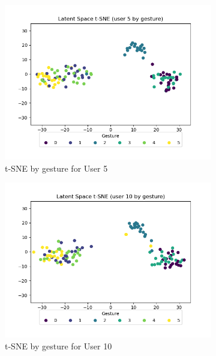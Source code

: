 \begin{figure}[b]
\begin{subfigure}{0.3\textwidth}
		\includegraphics[width=\textwidth]{figures/extended/long_ls_u5}
		\caption{t-SNE by gesture for User 5}
	\end{subfigure}
	\hfill
	\begin{subfigure}{0.3\textwidth}
		\centering
		\includegraphics[width=\textwidth]{figures/extended/long_ls_u10}
		\caption{t-SNE by gesture for User 10}
	\end{subfigure}
	\hfill
	\begin{subfigure}{0.3\textwidth}
		\centering

\end{subfigure}
\end{figure}

